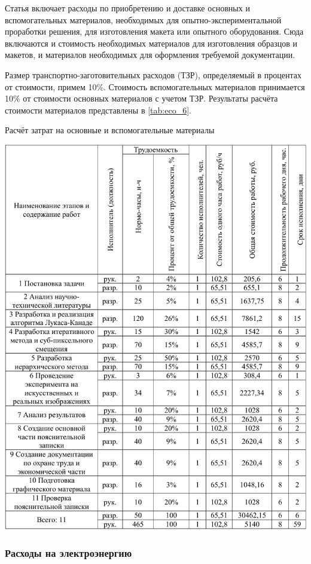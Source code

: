 Статья включает расходы по приобретению и доставке основных и вспомогательных материалов, необходимых для опытно-экспериментальной проработки решения, для изготовления макета или опытного оборудования. Сюда включаются и стоимость необходимых материалов для изготовления образцов и макетов, и материалов необходимых для оформления требуемой документации.

Размер транспортно-заготовительных расходов (ТЗР), определяемый в процентах от стоимости, примем 10\%. Стоимость вспомогательных материалов принимается 10\% от стоимости основных материалов с учетом ТЗР. Результаты расчёта стоимости материалов представлены в \ref{tab:eco_6}.

\begin{table}[!ht]
\caption{Расчёт затрат на основные и вспомогательные материалы}
\centering
\includegraphics[page=6, width=1\linewidth]{econom_table.pdf}
\label{tab:eco_6}
\end{table}

\subsubsection{Расходы на электроэнергию}

